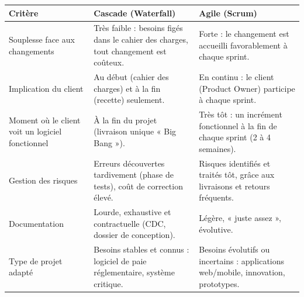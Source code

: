 \documentclass[11pt]{article}
\begin{document}
\begin{corrige}
\begin{center}
\begin{tabularx}{\linewidth}{|l|X|X|}
\hline
\rowcolor{popblueL}
\textbf{Critère} & \textbf{Cascade (Waterfall)} & \textbf{Agile (Scrum)} \\
\hline
Souplesse face aux changements & Très faible : besoins figés dans le cahier des charges, tout changement est coûteux. & Forte : le changement est accueilli favorablement à chaque sprint. \\
\hline
Implication du client & Au début (cahier des charges) et à la fin (recette) seulement. & En continu : le client (Product Owner) participe à chaque sprint. \\
\hline
Moment où le client voit un logiciel fonctionnel & À la fin du projet (livraison unique « Big Bang »). & Très tôt : un incrément fonctionnel à la fin de chaque sprint (2 à 4 semaines). \\
\hline
Gestion des risques & Erreurs découvertes tardivement (phase de tests), coût de correction élevé. & Risques identifiés et traités tôt, grâce aux livraisons et retours fréquents. \\
\hline
Documentation & Lourde, exhaustive et contractuelle (CDC, dossier de conception). & Légère, « juste assez », évolutive. \\
\hline
Type de projet adapté & Besoins stables et connus : logiciel de paie réglementaire, système critique. & Besoins évolutifs ou incertains : applications web/mobile, innovation, prototypes. \\
\hline
\end{tabularx}
\end{center}
\end{corrige}
\end{document}
